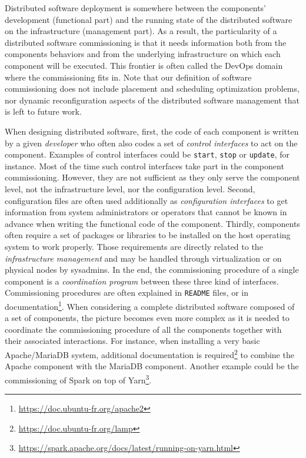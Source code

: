 Distributed software deployment is somewhere between the components' development (functional part) and the running state of the distributed software on the infrastructure (management part). As a result, the particularity of a distributed software commissioning is that it needs information both from the components behaviors and from the underlying infrastructure on which each component will be executed. This frontier is often called the DevOps domain where the commissioning fits in. Note that our definition of software commissioning does not include placement and scheduling optimization problems, nor dynamic reconfiguration aspects of the distributed software management that is left to future work.

When designing distributed software, first, the code of each component is written by a given \emph{developer} who often also codes a set of \emph{control 	interfaces} to act on the component. Examples of control interfaces could be \texttt{start}, \texttt{stop} or \texttt{update}, for instance. Most of the time such control interfaces take part in the component commissioning. However, they are not sufficient as they only serve the component level, not the infrastructure level, nor the configuration level. Second, configuration files are often used additionally as \emph{configuration interfaces} to get information from system administrators or operators that cannot be known in advance when writing the functional code of the component. Thirdly, components often require a set of packages or libraries to be installed on the host operating system to work properly. Those requirements are directly related to the \emph{infrastructure management} and may be handled through virtualization or on physical nodes by sysadmins.
%
In the end, the commissioning procedure of a single component is a \emph{coordination program} between these three kind of interfaces. Commissioning
procedures are often explained in \texttt{README} files, or in documentation\footnote{\url{https://doc.ubuntu-fr.org/apache2}}.
%
When considering a complete distributed software composed of a set of
components, the picture becomes even more complex as it is needed to coordinate
the commissioning procedure of all the components together with their associated
interactions. For instance, when installing a very basic Apache/MariaDB system,
additional documentation is
required\footnote{\url{https://doc.ubuntu-fr.org/lamp}} to combine the Apache
component with the MariaDB component. Another example could be the commissioning
of Spark on top of
Yarn\footnote{\url{https://spark.apache.org/docs/latest/running-on-yarn.html}}.

